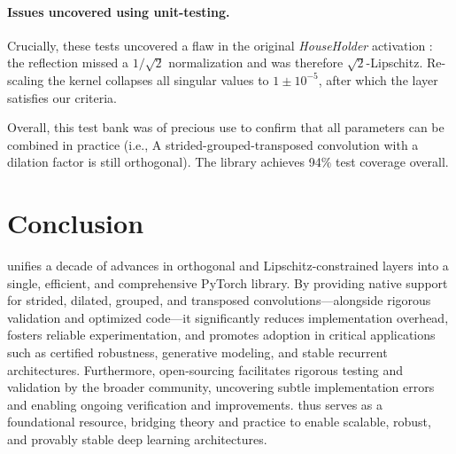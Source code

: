     \paragraph{Issues uncovered using unit-testing.}
    Crucially, these tests uncovered a flaw in the original \emph{HouseHolder} activation \cite{singla_improved_2022}: the reflection missed a $1/\sqrt{2}$ normalization and was therefore $\sqrt{2}$-Lipschitz. Re-scaling the kernel collapses all singular values to $1\pm10^{-5}$, after which the layer satisfies our criteria.  
    
    Overall, this test bank was of precious use to confirm that all parameters can be combined in practice (i.e., A strided-grouped-transposed convolution with a dilation factor is still orthogonal). The library achieves 94\% test coverage overall.



\section{Conclusion}

\Orthogonium unifies a decade of advances in orthogonal and Lipschitz-constrained layers into a single, efficient, and comprehensive PyTorch library. By providing native support for strided, dilated, grouped, and transposed convolutions—alongside rigorous validation and optimized code—it significantly reduces implementation overhead, fosters reliable experimentation, and promotes adoption in critical applications such as certified robustness, generative modeling, and stable recurrent architectures. Furthermore, open-sourcing \Orthogonium facilitates rigorous testing and validation by the broader community, uncovering subtle implementation errors and enabling ongoing verification and improvements. \Orthogonium thus serves as a foundational resource, bridging theory and practice to enable scalable, robust, and provably stable deep learning architectures.

